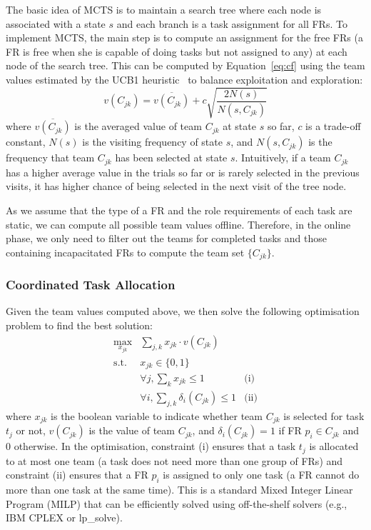 The basic idea of MCTS is to maintain a search tree where each node
is associated with a state $s$ and each branch is a task assignment
for all FRs. To implement MCTS, the main step is to compute
an assignment for the free FRs (a FR is free when she
is capable of doing tasks but not assigned to any) at each
node of the search tree. This can be computed by
Equation~\ref{eq:cf} using the team values estimated by the UCB1
heuristic~\cite{auer2002finite} to balance exploitation and
exploration:
\begin{equation}
  v(C_{jk}) = \overline{v(C_{jk})} + c\sqrt{\frac{2N(s)}{N(s, C_{jk})}}
\end{equation}
where $\overline{v(C_{jk})}$ is the averaged value of team $C_{jk}$
at state $s$ so far, $c$ is a trade-off constant, $N(s)$ is the
visiting frequency of state $s$, and $N(s, C_{jk})$ is the
frequency that team $C_{jk}$ has been selected at state $s$.
Intuitively, if a team $C_{jk}$ has  a higher average value in the
trials so far or is rarely selected in the previous visits, it has
higher chance of being selected in the next visit of the tree node.

As we assume that the type of a FR and the role requirements
of each task are static, we can compute all possible team values
offline. Therefore, in the online phase, we only need to filter out
the teams for completed tasks and those containing
incapacitated FRs to compute the team set $\{ C_{jk} \}$.

\subsubsection{Coordinated Task Allocation}
\noindent Given the team values computed above, we then solve the
following optimisation problem to find the best solution:
\begin{equation}
  \begin{array}{lll}
    \max\limits_{x_{jk}} & \sum_{j, k} x_{jk} \cdot v(C_{jk}) & \\[2pt]
    \mbox{s.t.} & x_{jk} \in \{0, 1\} & \\[2pt]
    & \forall j, \sum_{k} x_{jk} \leq 1 & \mbox{(i)} \\[2pt]
    & \forall i, \sum_{j, k} \delta_i(C_{jk}) \leq 1 & \mbox{(ii)}
  \end{array}
  \label{eq:cf}
\end{equation}
where $x_{jk}$ is the boolean variable to indicate whether team
$C_{jk}$ is selected for task $t_j$ or not, $v(C_{jk})$ is the value of team $C_{jk}$, and $\delta_i(C_{jk}) =
1$ if FR $p_i\in C_{jk}$ and 0 otherwise. In the
optimisation, constraint (i) ensures that a task $t_j$ is allocated
to at most one team (a task does not need more than one group of
FRs) and constraint (ii) ensures that a FR $p_i$ is
assigned to only one task (a FR cannot do more than one task
at the same time). This is a standard Mixed Integer Linear Program
(MILP) that can be efficiently solved  using off-the-shelf solvers (e.g., IBM CPLEX or lp\_solve).

